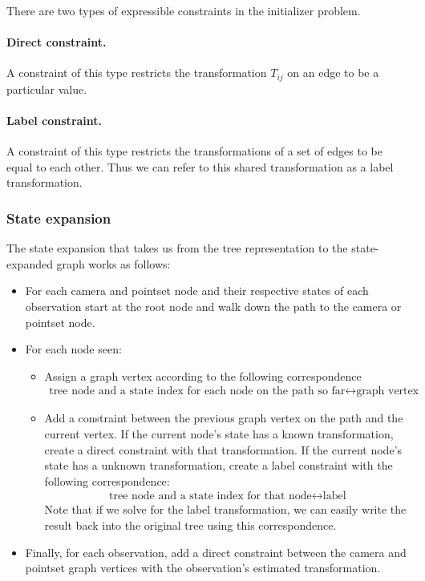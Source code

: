 There are two types of expressible constraints in the initializer problem.

\paragraph{Direct constraint.} 
A constraint of this type restricts the transformation $T_{ij}$ 
on an edge to be a particular value.

\paragraph{Label constraint.} 
A constraint of this type restricts the transformations of a set of edges
to be equal to each other. Thus we can refer to this shared transformation as a label transformation.

\subsubsection{State expansion}

The state expansion that takes us from the tree representation to the state-expanded graph works as follows:

\begin{itemize}
	\item For each camera and pointset node and their respective states of each observation
		start at the root node and walk down the path to the camera or pointset node.
	\item For each node seen:
	\begin{itemize}
		\item Assign a graph vertex according to the following correspondence
		\begin{align}
			\text{tree node and a state index for each node on the path so far}
			\leftrightarrow \text{graph vertex}
		\end{align}
		\item Add a constraint between the previous graph vertex on the path and the current vertex.
			If the current node's state has a known transformation, create a direct constraint
			with that transformation.
			If the current node's state has a unknown transformation, create a label constraint
			with the following correspondence:
		\begin{align}
			\text{tree node and a state index for that node}
			\leftrightarrow \text{label}
		\end{align}
			Note that if we solve for the label transformation, we can easily write the result back
			into the original tree using this correspondence.
	\end{itemize}
	\item Finally, for each observation, add a direct constraint between 
	the camera and pointset graph vertices with the observation's estimated transformation.
\end{itemize}

